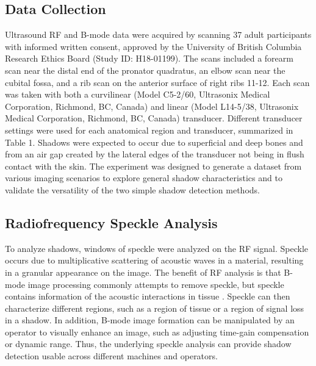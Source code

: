 \documentclass[authoryear,preprint,review,12pt]{elsarticle}
\begin{document}
\subsection*{Data Collection}
Ultrasound RF and B-mode data were acquired by scanning 37 adult participants with informed written consent, approved by the University of British Columbia Research Ethics Board (Study ID: H18-01199). The scans included a forearm scan near the distal end of the pronator quadratus, an elbow scan near the cubital fossa, and a rib scan on the anterior surface of right ribs 11-12. Each scan was taken with both a curvilinear (Model C5-2/60, Ultrasonix Medical Corporation, Richmond, BC, Canada) and linear (Model L14-5/38, Ultrasonix Medical Corporation, Richmond, BC, Canada) transducer. Different transducer settings were used for each anatomical region and transducer, summarized in Table 1. Shadows were expected to occur due to superficial and deep bones and from an air gap created by the lateral edges of the transducer not being in flush contact with the skin. The experiment was designed to generate a dataset from various imaging scenarios to explore general shadow characteristics and to validate the versatility of the two simple shadow detection methods. 

\subsection*{Radiofrequency Speckle Analysis}      
To analyze shadows, windows of speckle were analyzed on the RF signal. Speckle occurs due to multiplicative scattering of acoustic waves in a material, resulting in a granular appearance on the image. The benefit of RF analysis is that B-mode image processing commonly attempts to remove speckle, but speckle contains information of the acoustic interactions in tissue \citep{Burckhardt1978}. Speckle can then characterize different regions, such as a region of tissue or a region of signal loss in a shadow. In addition, B-mode image formation can be manipulated by an operator to visually enhance an image, such as adjusting time-gain compensation or dynamic range. Thus, the underlying speckle analysis can provide shadow detection usable across different machines and operators.
\end{document}
